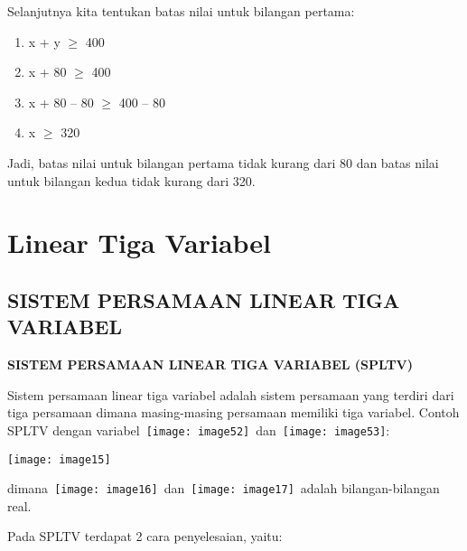 \documentclass[11pt,fleqn]{book} %
\begin{document}
\noindent Selanjutnya kita tentukan batas nilai untuk bilangan pertama:

\begin{enumerate}
\item  x + y $\mathrm{\ge}$ 400

\item  x + 80 $\mathrm{\ge}$ 400

\item  x + 80 -- 80 $\mathrm{\ge}$ 400 -- 80 

\item  x $\mathrm{\ge}$ 320
\end{enumerate}

\noindent Jadi, batas nilai untuk bilangan pertama tidak kurang dari 80 dan batas nilai untuk bilangan kedua tidak kurang dari 320.



\chapter{Linear Tiga Variabel}

\section{SISTEM PERSAMAAN LINEAR TIGA VARIABEL}

\noindent \textbf{SISTEM PERSAMAAN LINEAR TIGA VARIABEL (SPLTV)}

\noindent Sistem persamaan linear tiga variabel adalah sistem persamaan yang terdiri dari tiga persamaan dimana masing-masing persamaan memiliki tiga variabel. Contoh SPLTV dengan variabel~\texttt{[image: image52]}~dan~\texttt{[image: image53]}:

\noindent \texttt{[image: image15]}

\noindent dimana~\texttt{[image: image16]}~dan~\texttt{[image: image17]}~adalah bilangan-bilangan real.

\noindent Pada SPLTV terdapat 2 cara penyelesaian, yaitu:
\end{document}
